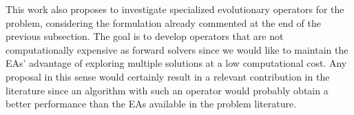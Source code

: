 			This work also proposes to investigate specialized evolutionary operators for the problem, considering the formulation already commented at the end of the previous subsection. The goal is to develop operators that are not computationally expensive as forward solvers since we would like to maintain the EAs' advantage of exploring multiple solutions at a low computational cost. Any proposal in this sense would certainly result in a relevant contribution in the literature since an algorithm with such an operator would probably obtain a better performance than the EAs available in the problem literature.
			
